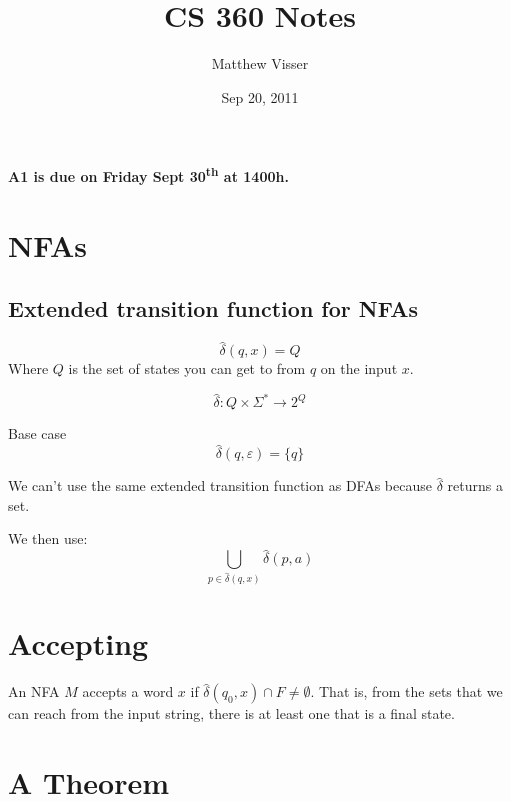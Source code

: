 \documentclass[12pt]{article}
\begin{document}
\title{CS 360 Notes}
\author{Matthew Visser}
\date{Sep 20, 2011}
\maketitle

\renewcommand{\hat}{\widehat}

\textbf{A1 is due on Friday Sept 30\textsuperscript{th} at 1400h.}

\section{NFAs}

\subsection{Extended transition function for NFAs}

\begin{equation}
    \hat{\delta}(q,x) =  Q
\end{equation}
Where $Q$ is the set of states you can get to from $q$ on the input $x$.

\begin{equation}
    \hat{\delta}: Q \times \Sigma^* \to 2^Q
\end{equation}

Base case \begin{equation}
    \hat{\delta}(q,\varepsilon) = \{q\}
\end{equation}

We can't use the same extended transition function as DFAs because
$\hat{\delta}$ returns a set.

We then use:
\begin{equation}
    \bigcup_{p \in \hat{\delta}(q,x)} \hat{\delta}(p,a)
\end{equation}

\section{Accepting}

An NFA $M$ accepts a word $x$ if $\hat{\delta}(q_0,x) \cap F \neq \emptyset$.
That is, from the sets that we can reach from the input string, there is at
least one that is a final state.

\section{A Theorem}
\end{document}
